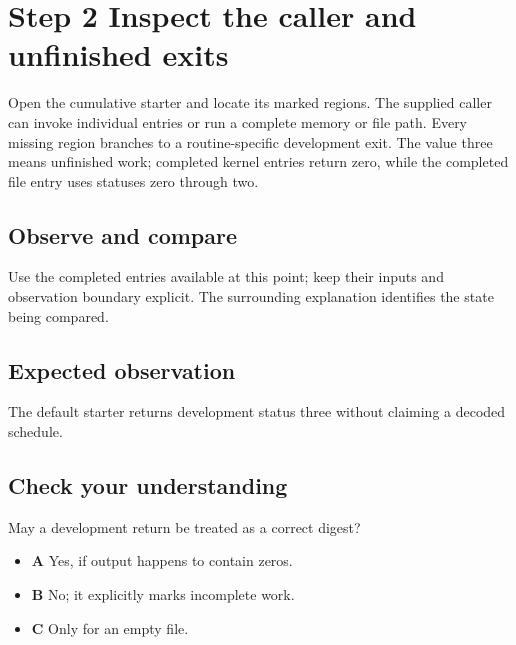 \section{Step 2 Inspect the caller and unfinished exits}\label{sha-s02}

Open the cumulative starter and locate its marked regions. The supplied caller can invoke individual entries or run a complete memory or file path. Every missing region branches to a routine-specific development exit. The value three means unfinished work; completed kernel entries return zero, while the completed file entry uses statuses zero through two.

\subsection{Observe and compare}
Use the completed entries available at this point; keep their inputs and observation boundary explicit. The surrounding explanation identifies the state being compared.

\subsection{Expected observation}
The default starter returns development status three without claiming a decoded schedule.

\subsection{Check your understanding}
May a development return be treated as a correct digest?

\begin{itemize}
  \item \textbf{A} Yes, if output happens to contain zeros.
  \item \textbf{B} No; it explicitly marks incomplete work.
  \item \textbf{C} Only for an empty file.
\end{itemize}
